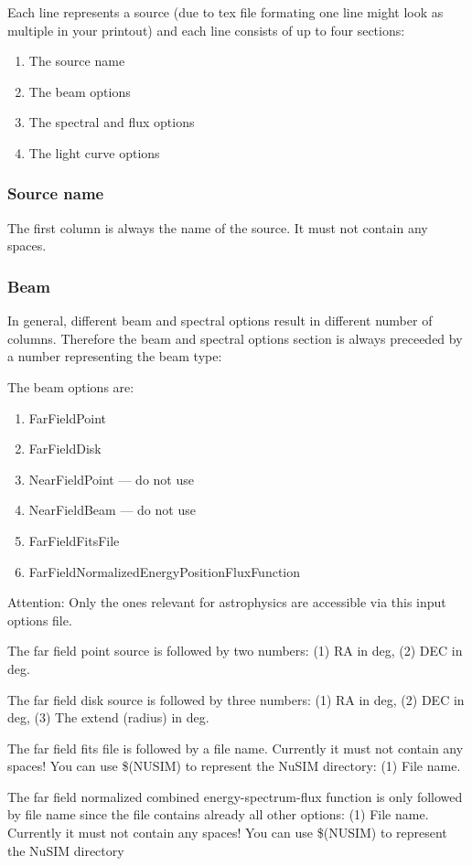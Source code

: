 Each line represents a source (due to tex file formating one line might look as multiple in your printout) and each line consists of up to four sections:
\begin{enumerate}
\item The source name
\item The beam options
\item The spectral and flux options
\item The light curve options
\end{enumerate}

\subsubsection{Source name}

The first column is always the name of the source. It must not contain any spaces.

\subsubsection{Beam}

In general, different beam and spectral options result in different number of columns.
Therefore the beam and spectral options section is always preceeded by a number representing the beam type:

The beam options are:
\begin{enumerate}
\item FarFieldPoint
\item FarFieldDisk
\item NearFieldPoint --- do not use
\item NearFieldBeam --- do not use
\item FarFieldFitsFile
\item FarFieldNormalizedEnergyPositionFluxFunction
\end{enumerate}
Attention: Only the ones relevant for astrophysics are accessible via this input options file.

The far field point source is followed by two numbers: (1) RA in deg, (2) DEC in deg.

The far field disk source is followed by three numbers: (1) RA in deg, (2) DEC in deg, (3) The extend (radius) in deg.

The far field fits file is followed by a file name. Currently it must not contain any spaces! You can use \$(NUSIM) to represent the NuSIM directory: (1) File name.

The far field normalized combined energy-spectrum-flux function is only followed by file name since the file contains already all other options: (1) File name. Currently it must not contain any spaces! You can use \$(NUSIM) to represent the NuSIM directory


